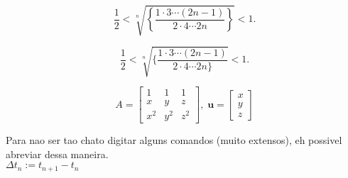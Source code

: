 \documentclass{article}
\begin{document}
\[
\frac{1}{2} < \sqrt[n]{
\left\{
\frac{1\cdot3\cdots(2n-1)}
{2\cdot4\cdots2n}\right\}} <1.
\]


\[
\frac{1}{2} < \sqrt[n]{
\{
\frac{1\cdot3\cdots(2n-1)}
{2\cdot4\cdots2n\}}} <1.
\]




\[
A =
\left[
\begin{array}{ccc}
1& 1 &1\\
x&y&z\\
x^2&y^2&z^2
\end{array}
\right], \; 
\mathbf{u} =
\left[
\begin{array}{c}
x \\ y \\ z
\end{array}
\right]
\]



\newcommand{\Dtn}{\Delta t_n}
Para nao ser tao chato digitar alguns comandos (muito extensos), eh possivel abreviar dessa maneira.\\
$\Dtn := t_{n+1} - t_n$
\end{document}

